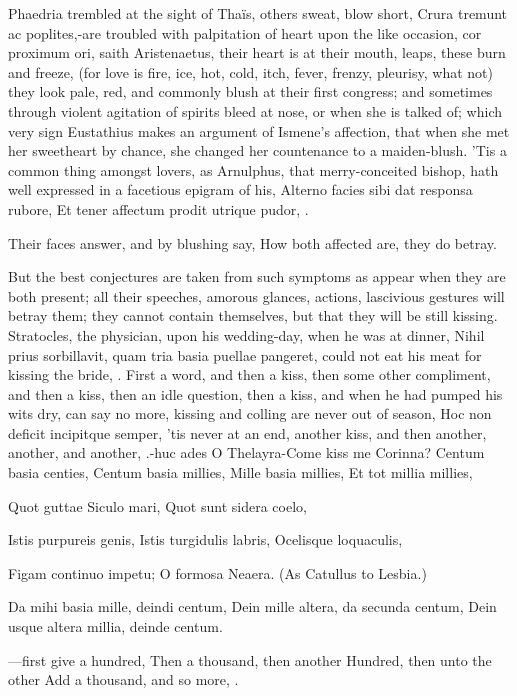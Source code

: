 {Phaedria trembled at the sight of Thaïs, others sweat, blow short,
Crura tremunt ac poplites,-are troubled with palpitation of heart upon
the like occasion, cor proximum ori, saith Aristenaetus, their
heart is at their mouth, leaps, these burn and freeze, (for love is
fire, ice, hot, cold, itch, fever, frenzy, pleurisy, what not) they
look pale, red, and commonly blush at their first congress; and
sometimes through violent agitation of spirits bleed at nose, or when
she is talked of; which very sign Eustathius makes an argument of
Ismene's affection, that when she met her sweetheart by chance, she
changed her countenance to a maiden-blush. 'Tis a common thing amongst
lovers, as Arnulphus, that merry-conceited bishop, hath well
expressed in a facetious epigram of his,
Alterno facies sibi dat responsa rubore,
Et tener affectum prodit utrique pudor, \etc{}.

Their faces answer, and by blushing say,
How both affected are, they do betray.

But the best conjectures are taken from such symptoms as appear when
they are both present; all their speeches, amorous glances, actions,
lascivious gestures will betray them; they cannot contain themselves,
but that they will be still kissing. Stratocles, the physician,
upon his wedding-day, when he was at dinner, Nihil prius sorbillavit,
quam tria basia puellae pangeret, could not eat his meat for kissing
the bride, \etc{}. First a word, and then a kiss, then some other
compliment, and then a kiss, then an idle question, then a kiss, and
when he had pumped his wits dry, can say no more, kissing and colling
are never out of season, Hoc non deficit incipitque semper, 'tis
never at an end, another kiss, and then another, another, and
another, \etc{}.-huc ades O Thelayra-Come kiss me Corinna?
Centum basia centies,
Centum basia millies,
Mille basia millies,
Et tot millia millies,

Quot guttae Siculo mari,
Quot sunt sidera coelo,

Istis purpureis genis,
Istis turgidulis labris,
Ocelisque loquaculis,

Figam continuo impetu;
O formosa Neaera. (As Catullus to Lesbia.)

Da mihi basia mille, deindi centum,
Dein mille altera, da secunda centum,
Dein usque altera millia, deinde centum.

---first give a hundred,
Then a thousand, then another
Hundred, then unto the other
Add a thousand, and so more, \etc{}.

}
